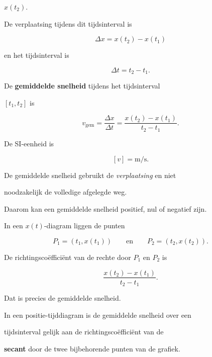 \documentclass{ximera}
\begin{document}
$x(t_2)$.

De verplaatsing tijdens dit tijdsinterval is

\[\Delta x=x(t_2)-x(t_1)\]

en het tijdsinterval is

\[\Delta t=t_2-t_1.\]

\begin{definitie}

De \textbf{gemiddelde snelheid} tijdens het tijdsinterval

$[t_1,t_2]$ is

\[\boxed{ v_{\mathrm{gem}} = \frac{\Delta x}{\Delta t} = \frac{x(t_2)-x(t_1)}{t_2-t_1}. }\]

De SI-eenheid is

\[[v]=\mathrm{m/s}.\]

\end{definitie}

De gemiddelde snelheid gebruikt de \emph{verplaatsing} en niet

noodzakelijk de volledige afgelegde weg.

Daarom kan een gemiddelde snelheid positief, nul of negatief zijn.


In een $x(t)$-diagram liggen de punten

\[P_1=(t_1,x(t_1)) \qquad\text{en}\qquad P_2=(t_2,x(t_2)).\]

De richtingscoëfficiënt van de rechte door $P_1$ en $P_2$ is

\[\frac{x(t_2)-x(t_1)}{t_2-t_1}.\]

Dat is precies de gemiddelde snelheid.

\begin{eigenschap}

In een positie-tijddiagram is de gemiddelde snelheid over een

tijdsinterval gelijk aan de richtingscoëfficiënt van de

\textbf{secant} door de twee bijbehorende punten van de grafiek.

\end{eigenschap}
\end{document}
